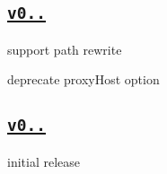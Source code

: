 \subsection*{\href{https://github.com/chimurai/http-proxy-middleware/releases/tag/v0.1.0}{\tt v0..}}


\begin{DoxyItemize}
\item support path rewrite
\item deprecate proxy\+Host option
\end{DoxyItemize}

\subsection*{\href{https://github.com/chimurai/http-proxy-middleware/releases/tag/v0.0.5}{\tt v0..}}


\begin{DoxyItemize}
\item initial release 
\end{DoxyItemize}
